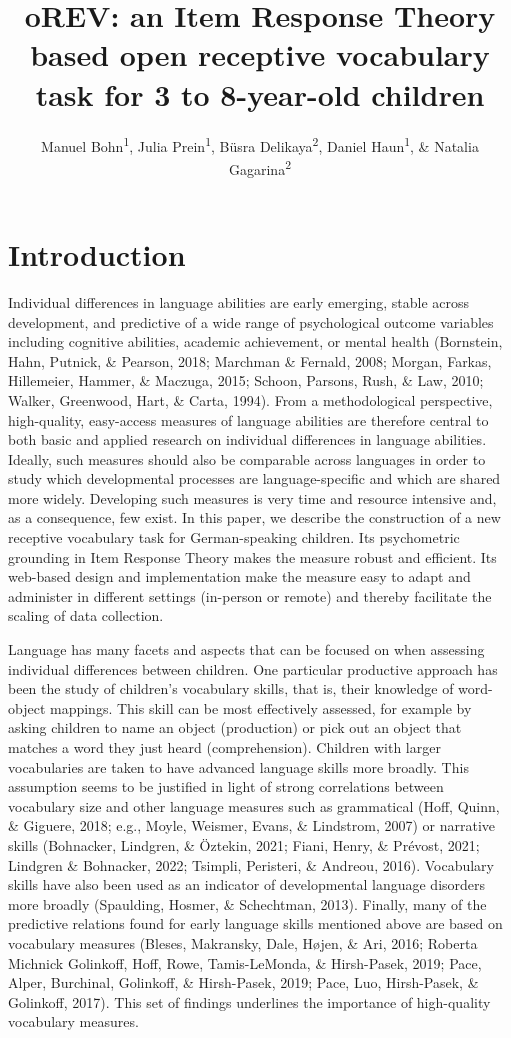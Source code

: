\documentclass[
  man,floatsintext]{apa6}
\title{oREV: an Item Response Theory based open receptive vocabulary task for 3 to 8-year-old children}
\author{Manuel Bohn\textsuperscript{1}, Julia Prein\textsuperscript{1}, Büsra Delikaya\textsuperscript{2}, Daniel Haun\textsuperscript{1}, \& Natalia Gagarina\textsuperscript{2}}
\date{}
\affiliation{\vspace{0.5cm}\textsuperscript{1} Department of Comparative Cultural Psychology, Max Planck Institute for Evolutionary Anthropology, Leipzig, Germany\\\textsuperscript{2} Leibniz-Zentrum Allgemeine Sprachwissenschaft, Berlin, Germany}
\begin{document}
\maketitle

\hypertarget{introduction}{%
\section{Introduction}\label{introduction}}

Individual differences in language abilities are early emerging, stable across development, and predictive of a wide range of psychological outcome variables including cognitive abilities, academic achievement, or mental health (Bornstein, Hahn, Putnick, \& Pearson, 2018; Marchman \& Fernald, 2008; Morgan, Farkas, Hillemeier, Hammer, \& Maczuga, 2015; Schoon, Parsons, Rush, \& Law, 2010; Walker, Greenwood, Hart, \& Carta, 1994). From a methodological perspective, high-quality, easy-access measures of language abilities are therefore central to both basic and applied research on individual differences in language abilities. Ideally, such measures should also be comparable across languages in order to study which developmental processes are language-specific and which are shared more widely. Developing such measures is very time and resource intensive and, as a consequence, few exist. In this paper, we describe the construction of a new receptive vocabulary task for German-speaking children. Its psychometric grounding in Item Response Theory makes the measure robust and efficient. Its web-based design and implementation make the measure easy to adapt and administer in different settings (in-person or remote) and thereby facilitate the scaling of data collection.

Language has many facets and aspects that can be focused on when assessing individual differences between children. One particular productive approach has been the study of children's vocabulary skills, that is, their knowledge of word-object mappings. This skill can be most effectively assessed, for example by asking children to name an object (production) or pick out an object that matches a word they just heard (comprehension). Children with larger vocabularies are taken to have advanced language skills more broadly. This assumption seems to be justified in light of strong correlations between vocabulary size and other language measures such as grammatical (Hoff, Quinn, \& Giguere, 2018; e.g., Moyle, Weismer, Evans, \& Lindstrom, 2007) or narrative skills (Bohnacker, Lindgren, \& Öztekin, 2021; Fiani, Henry, \& Prévost, 2021; Lindgren \& Bohnacker, 2022; Tsimpli, Peristeri, \& Andreou, 2016). Vocabulary skills have also been used as an indicator of developmental language disorders more broadly (Spaulding, Hosmer, \& Schechtman, 2013). Finally, many of the predictive relations found for early language skills mentioned above are based on vocabulary measures (Bleses, Makransky, Dale, Højen, \& Ari, 2016; Roberta Michnick Golinkoff, Hoff, Rowe, Tamis-LeMonda, \& Hirsh-Pasek, 2019; Pace, Alper, Burchinal, Golinkoff, \& Hirsh-Pasek, 2019; Pace, Luo, Hirsh-Pasek, \& Golinkoff, 2017). This set of findings underlines the importance of high-quality vocabulary measures.
\end{document}
